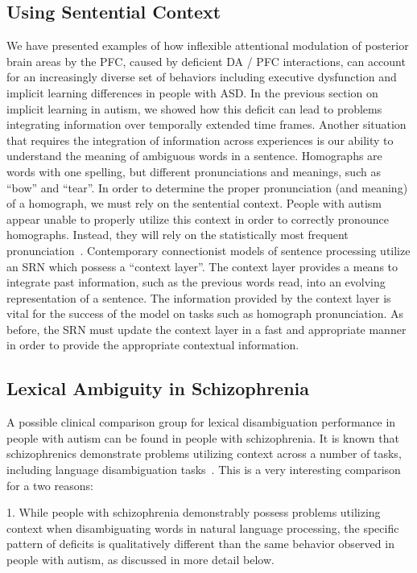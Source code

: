 %
%

\subsection{Using Sentential Context}
We have presented examples of how inflexible attentional modulation of posterior brain areas by the PFC, caused by deficient DA / PFC interactions, can account for an increasingly diverse set of behaviors including executive dysfunction and implicit learning differences in people with ASD.  In the previous section on implicit learning in autism, we showed how this deficit can lead to problems integrating information over temporally extended time frames.  Another situation that requires the integration of information across experiences is our ability to understand the meaning of ambiguous words in a sentence.  Homographs are words with one spelling, but different pronunciations and meanings, such as ``bow'' and ``tear''.  In order to determine the proper pronunciation (and meaning) of a homograph, we must rely on the sentential context. People with autism appear unable to properly utilize this context in order to correctly pronounce homographs.  Instead, they will rely on the statistically most frequent pronunciation~\cite{RefWorks:103,HappeF:1997:WCC_Homographs}.  
Contemporary connectionist models of sentence processing utilize an SRN which possess a ``context layer''.  The context layer provides a means to integrate past information, such as the previous words read, into an evolving representation of a sentence.  The information provided by the context layer is vital for the success of the model on tasks such as homograph pronunciation.  As before, the SRN must update the context layer in a fast and appropriate manner in order to provide the appropriate contextual information.  

\subsection{Lexical Ambiguity in Schizophrenia}
A possible clinical comparison group for lexical disambiguation performance in people with autism can be found in people with schizophrenia.  It is known that schizophrenics demonstrate problems utilizing context across a number of tasks, including language disambiguation tasks~\cite{CohenJD:1992:Schizophrenia}.  This is a very interesting comparison for a two reasons:

1.  While people with schizophrenia demonstrably possess problems utilizing context when disambiguating words in natural language processing, the specific pattern of deficits is qualitatively different than the same behavior observed in people with autism, as discussed in more detail below.

